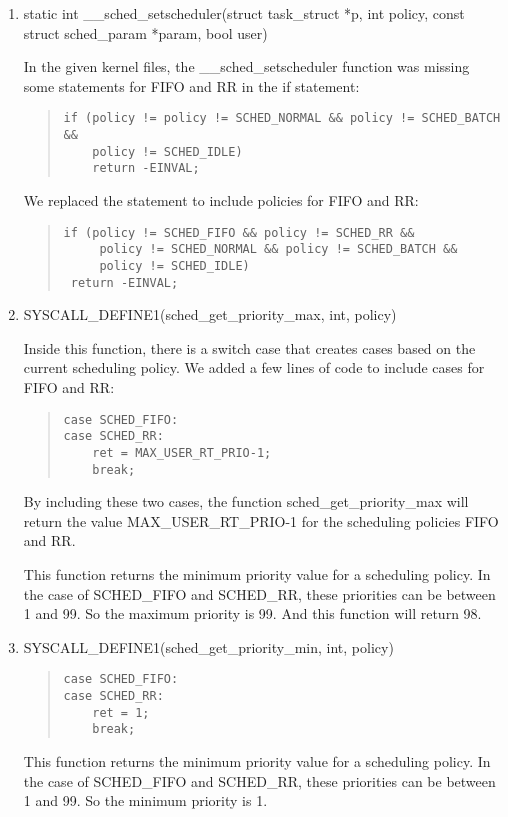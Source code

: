\documentclass[letterpaper,10pt,titlepage]{article}
\begin{document}
\begin{enumerate}
\item static int \_\_sched\_setscheduler(struct task\_struct *p, int policy, const struct sched\_param *param, bool user)

 In the given kernel files, the \_\_sched\_setscheduler function was missing some statements for FIFO and RR in the if statement:
\begin{quotation}
\begin{verbatim}
if (policy != policy != SCHED_NORMAL && policy != SCHED_BATCH &&
    policy != SCHED_IDLE)
    return -EINVAL;
\end{verbatim}
\end{quotation}

We replaced the statement to include policies for FIFO and RR:
\begin{quotation}
\begin{verbatim}
if (policy != SCHED_FIFO && policy != SCHED_RR &&
     policy != SCHED_NORMAL && policy != SCHED_BATCH &&
     policy != SCHED_IDLE)
 return -EINVAL;
\end{verbatim}
\end{quotation}

\item SYSCALL\_DEFINE1(sched\_get\_priority\_max, int, policy)

Inside this function, there is a switch case that creates cases based on the current scheduling policy. We added a few lines of code to include cases for FIFO and RR:
\begin{quotation}
\begin{verbatim}
case SCHED_FIFO:
case SCHED_RR:
    ret = MAX_USER_RT_PRIO-1;
    break;
\end{verbatim}
\end{quotation}
  
By including these two cases, the function sched\_get\_priority\_max will return the value MAX\_USER\_RT\_PRIO-1 for the scheduling policies FIFO and RR.

This function returns the minimum priority value for a scheduling policy. In the case of SCHED\_FIFO and SCHED\_RR, these priorities can be between 1 and 99. So the maximum priority is 99. And this function will return 98.

\newpage
\item SYSCALL\_DEFINE1(sched\_get\_priority\_min, int, policy)


\begin{quotation}
\begin{verbatim}
case SCHED_FIFO:
case SCHED_RR:
    ret = 1;
    break;
\end{verbatim}
\end{quotation}
This function returns the minimum priority value for a scheduling policy. In the case of SCHED\_FIFO and SCHED\_RR, these priorities can be between 1 and 99. So the minimum priority is 1.\\
\end{enumerate}
\end{document}
